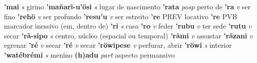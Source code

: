 

\textbf{'mai} \textit{s} {girino}
\textbf{'mañarĩ-u'ösi} \textit{s} {lugar de nascimento}
\textbf{'rata} \textit{posp} {perto de}
\textbf{'ra} \textit{v} {ser fino}
\textbf{'rehö} \textit{v} {ser profundo}
\textbf{'resu'u} \textit{v} {ser estreito}
\textbf{'re} {PREV} {locativo}
\textbf{'re} {PVB} {marcador inessivo (em, dentro de)}
\textbf{'ri} \textit{s} {casa}
\textbf{'ro} \textit{v} {feder}
\textbf{'rubu} \textit{v} {ter sede}
\textbf{'rutu} \textit{v} {secar}
\textbf{'rã-sipo} \textit{s} {centro, núcleo (espacial ou temporal)}
\textbf{'rãmi} \textit{v} {assustar}
\textbf{'rãzani} \textit{v} {egrenar}
\textbf{'ré} \textit{v} {secar}
\textbf{'ré} \textit{v} {secar}
\textbf{'röwipese} \textit{v} {perfurar, abrir}
\textbf{'röwi} \textit{s} {interior}
\textbf{'watébrémi} \textit{s} {menino}
\textbf{(h)adu} \textit{part} {aspecto permansivo}



